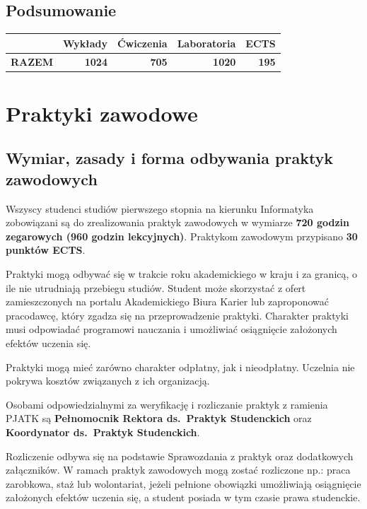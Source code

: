 \documentclass[12pt,a4paper]{article}
\begin{document}
\subsection*{Podsumowanie}

\begin{tabular}{lrrrr}
\toprule
\rowcolor{pjatkRed} {\color{white}} & {\color{white}\textbf{Wykłady}} & {\color{white}\textbf{Ćwiczenia}} & {\color{white}\textbf{Laboratoria}} & {\color{white}\textbf{ECTS}} \\
\midrule
\textbf{RAZEM} & \textbf{1024} & \textbf{705} & \textbf{1020} & \textbf{195} \\
\bottomrule
\end{tabular}



\newpage

\section{Praktyki zawodowe}

\subsection*{Wymiar, zasady i forma odbywania praktyk zawodowych}

Wszyscy studenci studiów pierwszego stopnia na kierunku Informatyka zobowiązani są do zrealizowania praktyk zawodowych w wymiarze \textbf{720 godzin zegarowych (960 godzin lekcyjnych)}. Praktykom zawodowym przypisano \textbf{30 punktów ECTS}.

Praktyki mogą odbywać się w trakcie roku akademickiego w kraju i za granicą, o ile nie utrudniają przebiegu studiów. Student może skorzystać z ofert zamieszczonych na portalu Akademickiego Biura Karier lub zaproponować pracodawcę, który zgadza się na przeprowadzenie praktyki. Charakter praktyki musi odpowiadać programowi nauczania i umożliwiać osiągnięcie założonych efektów uczenia się.

Praktyki mogą mieć zarówno charakter odpłatny, jak i nieodpłatny. Uczelnia nie pokrywa kosztów związanych z ich organizacją.

Osobami odpowiedzialnymi za weryfikację i rozliczanie praktyk z ramienia PJATK są \textbf{Pełnomocnik Rektora ds.~Praktyk Studenckich} oraz \textbf{Koordynator ds.~Praktyk Studenckich}.

Rozliczenie odbywa się na podstawie Sprawozdania z praktyk oraz dodatkowych załączników. W ramach praktyk zawodowych mogą zostać rozliczone np.: praca zarobkowa, staż lub wolontariat, jeżeli pełnione obowiązki umożliwiają osiągnięcie założonych efektów uczenia się, a student posiada w tym czasie prawa studenckie.
\end{document}
